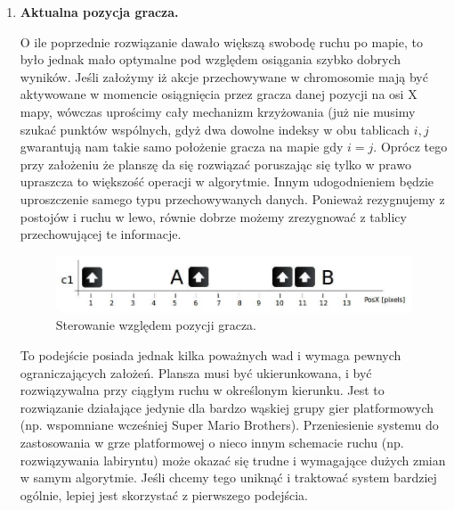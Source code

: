 \begin{par}
\begin{enumerate}
\begin{par}
	\end{par}
	\item
	{\bf Aktualna pozycja gracza.}
	\begin{par}
		O ile poprzednie rozwiązanie dawało większą swobodę ruchu po mapie, to było jednak mało optymalne pod względem osiągania szybko dobrych wyników.
		Jeśli założymy iż akcje przechowywane w chromosomie mają być aktywowane w momencie osiągnięcia przez gracza danej pozycji na osi X mapy, wówczas uprościmy cały mechanizm krzyżowania (już nie musimy szukać punktów wspólnych, gdyż dwa dowolne indeksy w obu tablicach $i,j$ gwarantują nam takie samo położenie gracza na mapie gdy $i=j$.
		Oprócz tego przy założeniu że planszę da się rozwiązać poruszając się tylko w prawo upraszcza to większość operacji w algorytmie.
		Innym udogodnieniem będzie uproszczenie samego typu przechowywanych danych. Ponieważ rezygnujemy z postojów i ruchu w lewo, równie dobrze możemy zrezygnować z tablicy przechowującej te informacje.

		\begin{par}
		\begin{figure}[!h]
		\centering
		\includegraphics[width=\textwidth]{obrazki/sterowanie2.jpg}
		\caption{Sterowanie względem pozycji gracza.}
		\label{fig:sterowanie2}
		\end{figure}
		\end{par}

		To podejście posiada jednak kilka poważnych wad i wymaga pewnych ograniczających założeń.
		Plansza musi być ukierunkowana, i być rozwiązywalna przy ciągłym ruchu w określonym kierunku.
		Jest to rozwiązanie działające jedynie dla bardzo wąskiej grupy gier platformowych (np. wspomniane wcześniej Super Mario Brothers).
		Przeniesienie systemu do zastosowania w grze platformowej o nieco innym schemacie ruchu (np. rozwiązywania labiryntu) może okazać się trudne i wymagające dużych zmian w samym algorytmie.
		Jeśli chcemy tego uniknąć i traktować system bardziej ogólnie, lepiej jest skorzystać z pierwszego podejścia.
	\end{par}
	\end{enumerate}
\end{par}



